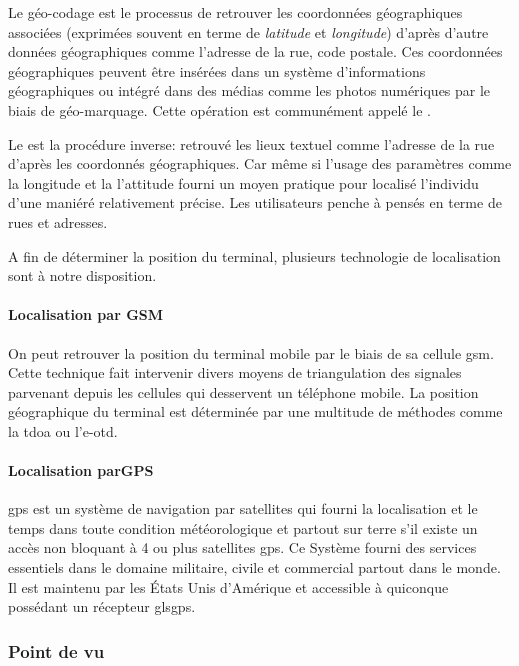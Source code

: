 Le géo-codage est le processus de retrouver les coordonnées
géographiques associées (exprimées souvent en terme de \textit{latitude}
et \textit{longitude}) d'après d'autre données géographiques comme
l'adresse de la rue, code postale. Ces coordonnées géographiques peuvent
être insérées dans un système d'informations géographiques ou intégré dans
des médias comme les photos numériques par le biais de géo-marquage.
Cette opération est communément appelé le .

Le  est la procédure inverse: retrouvé les lieux textuel comme l'adresse de la rue d'après les coordonnés géographiques. Car même si l'usage des paramètres comme la longitude et la l'attitude fourni un moyen pratique pour localisé l'individu d'une maniéré relativement précise. Les utilisateurs penche à pensés en terme de rues et adresses.

A fin de déterminer la position du terminal, plusieurs technologie de localisation sont à notre disposition.

\paragraph[Localisation par GSM]{Localisation par GSM}

On peut retrouver la position du terminal mobile par le biais de sa
cellule \gls{gsm}. Cette technique fait intervenir divers moyens de
triangulation des signales parvenant depuis les cellules qui desservent
un téléphone mobile. La position géographique du terminal est déterminée
par une multitude de méthodes comme la \gls{tdoa} ou l'\gls{e-otd}.

\paragraph[Localisation parGPS]{Localisation parGPS\cite{enig:gps}}

\gls{gps} est un système de navigation par satellites qui fourni la
localisation et le temps dans toute condition météorologique et partout
sur terre s'il existe un accès non bloquant à 4 ou plus satellites
\gls{gps}. Ce Système fourni des services essentiels dans le domaine
militaire, civile et commercial partout dans le monde. Il est maintenu
par les États Unis d'Amérique et accessible à quiconque possédant un
récepteur gls{gps}.

\subsubsection[Point de vu \android{}]{Point de vu \android{}\cite{pa4ad:chptr13}}

